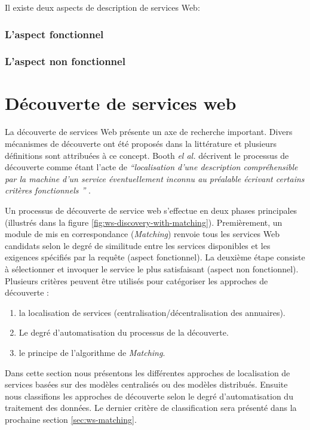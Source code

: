   Il existe deux aspects de description de services Web:

    \subsubsection{L'aspect fonctionnel}
    \label{sec:aspect-fonctionnel}

    \subsubsection{L'aspect non fonctionnel}
    \label{sec:aspect-non-fonctionel}

\section{Découverte de services web}
\label{sec:ws-discovery}
La découverte de services Web présente un axe de recherche
important. Divers mécanismes de découverte ont été proposés dans la
littérature et plusieurs définitions sont attribuées à ce
concept. Booth \textit{el al.}  décrivent le processus de découverte
comme étant l'acte de \textit{``localisation d'une description
  compréhensible par la machine d'un service éventuellement inconnu au
  préalable écrivant certains critères fonctionnels ''}
\cite{booth2004web}.



Un processus de découverte de service web s'effectue en deux phases
principales (illustrés dans la figure
\ref{fig:ws-discovery-with-matching}). Premièrement, un module de mis
en correspondance (\textit{Matching}) renvoie tous les services Web
candidats selon le degré de similitude entre les services disponibles
et les exigences spécifiés par la requête (aspect fonctionnel). La
deuxième étape consiste à sélectionner et invoquer le service le plus
satisfaisant (aspect non fonctionnel). Plusieurs critères peuvent être
utilisés pour catégoriser les approches de découverte \cite{elie2010}:

\begin{enumerate}
\item la localisation de services (centralisation/décentralisation
  des annuaires).
\item Le degré d'automatisation du processus de la découverte.
\item le principe de l'algorithme de \textit{Matching}.
\end{enumerate}

Dans cette section nous présentons les différentes approches de
localisation de services basées sur des modèles centralisés ou des
modèles distribués. Ensuite nous classifions les approches de
découverte selon le degré d'automatisation du traitement des
données. Le dernier critère de classification sera présenté dans la
prochaine section \ref{sec:ws-matching}.

